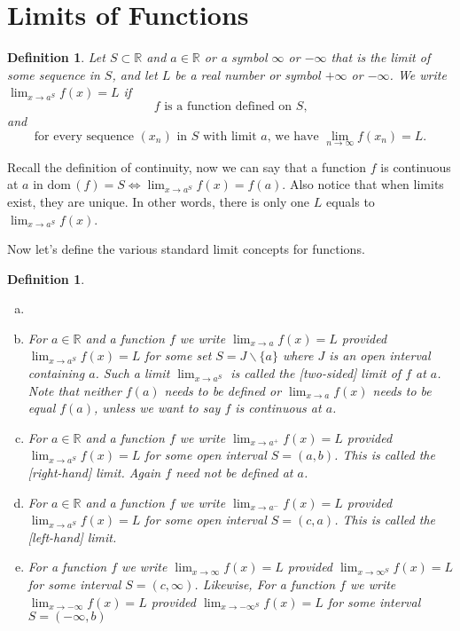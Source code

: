 \documentclass[12pt, lettersize]{book}
\newtheorem{dfn}[thm]{Definition}
\newcommand{\R}{\mathbb{R}}
\newcommand{\dom}{\text{dom}\,}
\begin{document}
		\section{Limits of Functions}
			\begin{dfn}
			Let $S\subset\R$ and $a\in\R$ or a symbol $\infty$ or $-\infty$ that is the limit of some sequence in $S$, and let $L$ be a real number or symbol $+\infty$ or $-\infty$. We write $\lim_{x\rightarrow a^S} f(x)=L$ if
			\begin{displaymath}
				\text{$f$ is a function defined on $S$,}
			\end{displaymath}
			and
			\begin{displaymath}
				\text{for every sequence $(x_n)$ in $S$ with limit $a$, we have $\lim_{n\rightarrow\infty}f(x_n)=L$}.
			\end{displaymath}
			\end{dfn}
			Recall the definition of continuity, now we can say that a function $f$ is continuous at $a$ in $\dom(f)=S \iff \lim_{x\rightarrow a^S} f(x)=f(a)$. Also notice that when limits exist, they are unique. In other words, there
			is only one $L$ equals to $\lim_{x\rightarrow a^S} f(x)$.  
			
			Now let's define the various standard limit concepts for functions.
			\begin{dfn}
			\begin{enumerate}[(a)]
				\item[]
				\item For $a\in\R$ and a function $f$ we write $\lim_{x\rightarrow a}f(x)=L$ provided $\lim_{x\rightarrow a^S}f(x)=L$ for some set $S=J\backslash\{a\}$ where $J$ is an open interval containing $a$. Such a limit 
				$\lim_{x\rightarrow a^S}$ is called the \emph{[two-sided]} limit of $f$ at $a$. Note that neither $f(a)$ needs to be defined or $\lim_{x\rightarrow a}f(x)$ needs to be equal $f(a)$, unless we want to say $f$ is continuous at $a$.
				\item For $a\in\R$ and a function $f$ we write $\lim_{x\rightarrow a^+}f(x)=L$ provided $\lim_{x\rightarrow a^S}f(x)=L$ for some open interval $S=(a,b)$. This is called the \emph{[right-hand]} limit. Again $f$ need not
				be defined at $a$.
				\item For $a\in\R$ and a function $f$ we write $\lim_{x\rightarrow a^-}f(x)=L$ provided $\lim_{x\rightarrow a^S}f(x)=L$ for some open interval $S=(c,a)$. This is called the \emph{[left-hand]} limit.
				\item For a function $f$ we write $\lim_{x\rightarrow\infty}f(x)=L$ provided $\lim_{x\rightarrow\infty^S}f(x)=L$ for some interval $S=(c,\infty)$. Likewise, For a function $f$ we write $\lim_{x\rightarrow-\infty}f(x)=L$ provided $\lim_{x\rightarrow-\infty^S}f(x)=L$ for some interval $S=(-\infty,b)$
			\end{enumerate} 
			\end{dfn}
			
\end{document}
